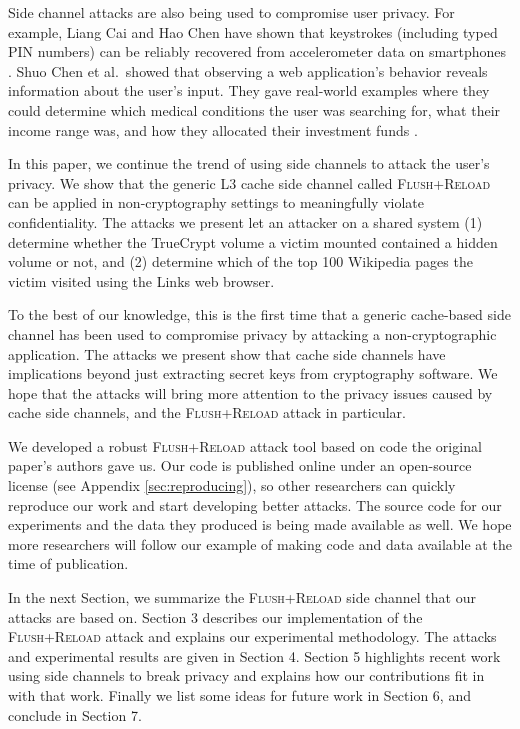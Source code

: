 \documentclass[letterpaper,twocolumn,10pt]{article}
\begin{document}
Side channel attacks are also being used to compromise user privacy. For
example, Liang Cai and Hao Chen have shown that keystrokes (including typed PIN
numbers) can be reliably recovered from accelerometer data on smartphones
\cite{cai2012practicality}. Shuo Chen et al.\ showed that observing a web
application's behavior reveals information about the user's input. They gave
real-world examples where they could determine which medical conditions the user
was searching for, what their income range was, and how they allocated their
investment funds \cite{chen2010side}.

In this paper, we continue the trend of using side channels to attack the user's
privacy. We show that the generic L3 cache side channel called \textsc{Flush+Reload}
\cite{yarom2013flush} can be applied in non-cryptography settings to
meaningfully violate confidentiality. The attacks we present let an attacker on
a shared system (1) determine whether the TrueCrypt volume a victim mounted
contained a hidden volume or not, and (2) determine which of the top 100
Wikipedia pages the victim visited using the Links web browser.

To the best of our knowledge, this is the first time that a generic cache-based
side channel has been used to compromise privacy by attacking
a non-cryptographic application. The attacks we present show that cache side
channels have implications beyond just extracting secret keys from cryptography
software. We hope that the attacks will bring more attention to the privacy
issues caused by cache side channels, and the \textsc{Flush+Reload} attack in
particular.

We developed a robust \textsc{Flush+Reload} attack tool based on code the
original paper's authors gave us. Our code is published online under an
open-source license (see Appendix \ref{sec:reproducing}), so other researchers
can quickly reproduce our work and start developing better attacks. The source
code for our experiments and the data they produced is being made available as
well. We hope more researchers will follow our example of making code and data
available at the time of publication.

In the next Section, we summarize the \textsc{Flush+Reload} side channel that our attacks
are based on. Section 3 describes our implementation of the \textsc{Flush+Reload} attack
and explains our experimental methodology. The attacks and experimental results
are given in Section 4. Section 5 highlights recent work using side channels to
break privacy and explains how our contributions fit in with that work. Finally
we list some ideas for future work in Section 6, and conclude in Section 7.
\end{document}
